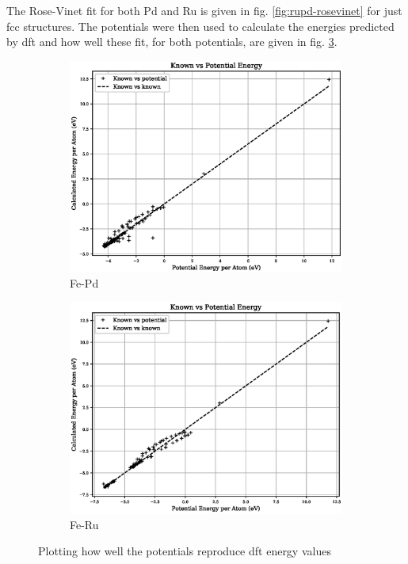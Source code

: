 The Rose-Vinet fit for both Pd and Ru is given in fig. \ref{fig:rupd-rosevinet} for just \acrshort{fcc} structures.  The potentials were then used to calculate the energies predicted by \acrshort{dft} and how well these fit, for both potentials, are given in fig. \ref{fig:fepd-feru-fit}.

\begin{figure}[htb]
\begin{subfigure}{.48\textwidth}
  \centering
  \includegraphics[width=.94\linewidth]{chapters/potentials_fe_pd_ru/fepd_potential/potential_known_energy_full_set.eps} 
  \caption{Fe-Pd}
  \label{fig:fepd-fit}
\end{subfigure}
\begin{subfigure}{.48\textwidth}
  \centering
  \includegraphics[width=.94\linewidth]{chapters/potentials_fe_pd_ru/feru_potential/potential_known_energy_full_set.eps} 
  \caption{Fe-Ru}
  \label{fig:feru-fit}
\end{subfigure}
\caption{Plotting how well the potentials reproduce \acrshort{dft} energy values}
\label{fig:fepd-feru-fit}
\end{figure}

